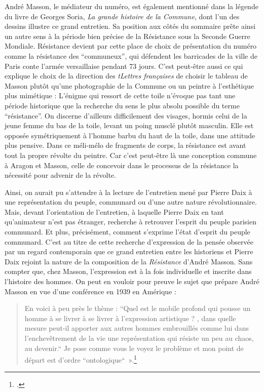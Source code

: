 André Masson, le médiateur du numéro, est également mentionné dans la légende du livre de Georges Soria, \emph{La grande histoire de la Commune}, dont l’un des dessins illustre ce grand entretien. Sa position aux côtés du sommaire prête ainsi un autre sens à la période bien précise de la Résistance sous la Seconde Guerre Mondiale. Résistance devient par cette place de choix de présentation du numéro comme la résistance des \enquote{communeux}, qui défendent les barricades de la ville de Paris conte l’armée versaillaise pendant 73 jours. C’est peut-être aussi ce qui explique le choix de la direction des \emph{tLettres françaises} de choisir le tableau de Masson plutôt qu’une photographie de la Commune ou un peintre à l’esthétique plus mimétique : L’énigme qui ressort de cette toile n’évoque pas tant une période historique que la recherche du sens le plus absolu possible du terme \enquote{résistance}. On discerne d’ailleurs difficilement des visages, hormis celui de la jeune femme du bas de la toile, levant un poing musclé plutôt masculin. Elle est opposée symétriquement à l’homme barbu du haut de la toile, dans une attitude plus pensive. Dans ce méli-mélo de fragments de corps, la résistance est avant tout la propre révolte du peintre. Car c’est peut-être là une conception commune à Aragon et Masson, celle de concevoir dans le processus de la résistance la nécessité pour advenir de la révolte.

	 Ainsi, on aurait pu s’attendre à la lecture de l’entretien mené par Pierre Daix à une représentation du peuple, communard ou d’une autre nature révolutionnaire.  Mais, devant l’orientation de l’entretien, à laquelle Pierre Daix en tant qu’animateur n’est pas étranger, recherche à retrouver l’esprit du peuple parisien communard. Et plus, précisément, comment s’exprime l’état d’esprit du peuple communard. C’est au titre de cette recherche d’expression de la pensée observée par un regard contemporain que ce grand entretien entre les historiens et Pierre Daix rejoint la nature de la composition de la \emph{Résistance} d’André Masson. Sans compter que, chez Masson, l’expression est à la fois individuelle et inscrite dans l’histoire des hommes. On peut en vouloir pour preuve le sujet que prépare André Masson en vue d’une conférence en 1939 en Amérique :
\begin{quote}
En voici  à peu près le thème : “Quel est le mobile profond qui pousse un homme à se livrer à se livrer  à l’expression artistique ? , dans quelle mesure peut-il apporter aux autres hommes embrouillés comme lui dans l’enchevêtrement de la vie une représentation qui résiste un peu au chaos, au devenir.“ Je pose comme vous le voyez le problème et mon point de départ est d’ordre “ontologique“ ».\footcite[p259]{rebelle} \end{quote}
 
